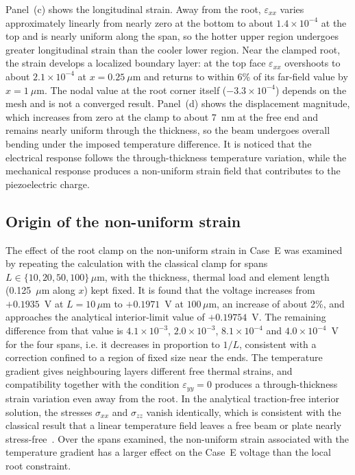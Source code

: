 \documentclass[a4paper,12pt]{elsarticle}
\begin{document}
Panel~(c) shows the longitudinal strain. Away from the root, $\varepsilon_{xx}$ varies
approximately linearly from nearly zero at the bottom to about $1.4\times10^{-4}$ at the top
and is nearly uniform along the span, so the hotter upper region undergoes greater
longitudinal strain than the cooler lower region. Near the clamped root, the strain develops
a localized boundary layer: at the top face $\varepsilon_{xx}$ overshoots to about
$2.1\times10^{-4}$ at $x=0.25~\mu$m and returns to within 6\% of its far-field value by
$x=1~\mu$m. The nodal value at the root corner itself ($-3.3\times10^{-4}$) depends on the
mesh and is not a converged result. Panel~(d) shows the displacement magnitude, which
increases from zero at the clamp to about 7~nm at the free end and remains nearly uniform
through the thickness, so the beam undergoes overall bending under the imposed temperature
difference. It is noticed that the electrical response follows the through-thickness
temperature variation, while the mechanical response produces a non-uniform strain field that
contributes to the piezoelectric charge.

\subsection{Origin of the non-uniform strain}
\label{sec:clamp}

The effect of the root clamp on the non-uniform strain in Case~E was examined by repeating
the calculation with the classical clamp for spans $L\in\{10,20,50,100\}\,\mu\text{m}$, with
the thickness, thermal load and element length (0.125~$\mu$m along $x$) kept fixed. It is
found that the voltage increases from $+0.1935$~V at $L=10\,\mu\text{m}$ to $+0.1971$~V at
$100\,\mu\text{m}$, an increase of about 2\%, and approaches the analytical interior-limit
value of $+0.19754$~V. The remaining difference from that value is $4.1\times10^{-3}$,
$2.0\times10^{-3}$, $8.1\times10^{-4}$ and $4.0\times10^{-4}$~V for the four spans, i.e. it
decreases in proportion to $1/L$, consistent with a correction confined to a region of fixed
size near the ends. The temperature gradient gives neighbouring layers different free thermal
strains, and compatibility together with the condition $\varepsilon_{yy}=0$ produces a
through-thickness strain variation even away from the root. In the analytical traction-free
interior solution, the stresses $\sigma_{xx}$ and $\sigma_{zz}$ vanish identically, which is
consistent with the classical result that a linear temperature field leaves a free beam or
plate nearly stress-free~\cite{BoleyWeiner1997}. Over the spans examined, the non-uniform
strain associated with the temperature gradient has a larger effect on the Case~E voltage than
the local root constraint.
\end{document}
